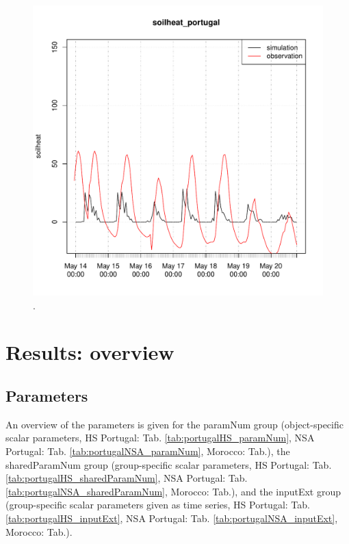 \documentclass{scrreprt}
\begin{document}
\begin{figure}[ht]
  \centering
  \includegraphics[width=0.8\hsize]{./plot_soilheat_compare_portugal_NSA_2014-05-13_2014-05-20.pdf}
  \caption{.}
  \label{fig:portugal_NSA_soilheat1}
\end{figure}



\chapter{Results: overview} \label{ch:results}

\section{Parameters} \label{sec:results_par}

An overview of the parameters is given for the \textsf{paramNum} group (object-specific scalar parameters, HS Portugal: Tab. \ref{tab:portugalHS_paramNum}, NSA Portugal: Tab. \ref{tab:portugalNSA_paramNum}, Morocco: Tab.), the \textsf{sharedParamNum} group (group-specific scalar parameters, HS Portugal: Tab. \ref{tab:portugalHS_sharedParamNum}, NSA Portugal: Tab. \ref{tab:portugalNSA_sharedParamNum}, Morocco: Tab.), and the \textsf{inputExt} group (group-specific scalar parameters given as time series, HS Portugal: Tab. \ref{tab:portugalHS_inputExt}, NSA Portugal: Tab. \ref{tab:portugalNSA_inputExt}, Morocco: Tab.).


\end{document}
